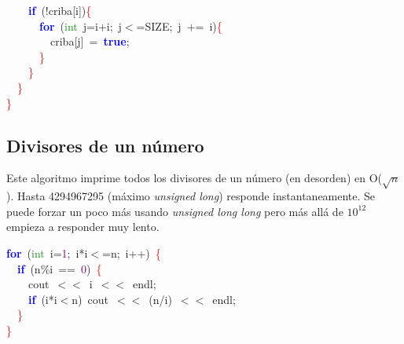 \documentclass[10pt,a4paper,twoside]{article}
\begin{document}
{{{\mbox{}\ \ \ \ \textbf{\textcolor{Blue}{if}}\ \textcolor{BrickRed}{(!}criba\textcolor{BrickRed}{[}i\textcolor{BrickRed}{])}\textcolor{Red}{\{} \\
\mbox{}\ \ \ \ \ \ \textbf{\textcolor{Blue}{for}}\ \textcolor{BrickRed}{(}\textcolor{ForestGreen}{int}\ j\textcolor{BrickRed}{=}i\textcolor{BrickRed}{+}i\textcolor{BrickRed}{;}\ j\textcolor{BrickRed}{$<$=}SIZE\textcolor{BrickRed}{;}\ j\ \textcolor{BrickRed}{+=}\ i\textcolor{BrickRed}{)}\textcolor{Red}{\{} \\
\mbox{}\ \ \ \ \ \ \ \ criba\textcolor{BrickRed}{[}j\textcolor{BrickRed}{]}\ \textcolor{BrickRed}{=}\ \textbf{\textcolor{Blue}{true}}\textcolor{BrickRed}{;} \\
\mbox{}\ \ \ \ \ \ \textcolor{Red}{\}} \\
\mbox{}\ \ \ \ \textcolor{Red}{\}} \\
\mbox{}\ \ \textcolor{Red}{\}} \\
\mbox{}\textcolor{Red}{\}} \\

} \normalfont\normalsize

%

\subsection{Divisores de un número}
Este algoritmo imprime todos los divisores de un número (en desorden) en O($\sqrt{n}$).
Hasta 4294967295 (máximo \textit{unsigned long}) responde instantaneamente. Se puede
forzar un poco más usando \textit{unsigned long long} pero más allá de $10^{12}$ empieza a
responder muy lento.

\bigskip

\noindent
{\ttfamily \raggedright {
\mbox{}\textbf{\textcolor{Blue}{for}}\ \textcolor{BrickRed}{(}\textcolor{ForestGreen}{int}\ i\textcolor{BrickRed}{=}\textcolor{Purple}{1}\textcolor{BrickRed}{;}\ i\textcolor{BrickRed}{*}i\textcolor{BrickRed}{$<$=}n\textcolor{BrickRed}{;}\ i\textcolor{BrickRed}{++)}\ \textcolor{Red}{\{} \\
\mbox{}\ \ \textbf{\textcolor{Blue}{if}}\ \textcolor{BrickRed}{(}n\textcolor{BrickRed}{\%}i\ \textcolor{BrickRed}{==}\ \textcolor{Purple}{0}\textcolor{BrickRed}{)}\ \textcolor{Red}{\{} \\
\mbox{}\ \ \ \ cout\ \textcolor{BrickRed}{$<<$}\ i\ \textcolor{BrickRed}{$<<$}\ endl\textcolor{BrickRed}{;} \\
\mbox{}\ \ \ \ \textbf{\textcolor{Blue}{if}}\ \textcolor{BrickRed}{(}i\textcolor{BrickRed}{*}i\textcolor{BrickRed}{$<$}n\textcolor{BrickRed}{)}\ cout\ \textcolor{BrickRed}{$<<$}\ \textcolor{BrickRed}{(}n\textcolor{BrickRed}{/}i\textcolor{BrickRed}{)}\ \textcolor{BrickRed}{$<<$}\ endl\textcolor{BrickRed}{;} \\
\mbox{}\ \ \textcolor{Red}{\}} \\
\mbox{}\textcolor{Red}{\}}\  \\
} \normalfont\normalsize

}}}
\end{document}

